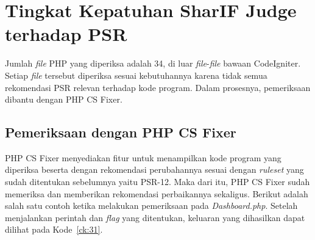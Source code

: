 \section{Tingkat Kepatuhan SharIF Judge terhadap PSR}
\label{sec:tingkat_patuh}
Jumlah \textit{file} PHP yang diperiksa adalah 34, di luar \textit{file}-\textit{file} bawaan CodeIgniter. Setiap \textit{file} tersebut diperiksa sesuai kebutuhannya karena tidak semua rekomendasi PSR relevan terhadap kode program. Dalam prosesnya, pemeriksaan dibantu dengan PHP CS Fixer. 

\subsection{Pemeriksaan dengan PHP CS Fixer}
\label{subsec:periksa_otomatis}
PHP CS Fixer menyediakan fitur untuk menampilkan kode program yang diperiksa beserta dengan rekomendasi perubahannya sesuai dengan \textit{ruleset} yang sudah ditentukan sebelumnya yaitu PSR-12. Maka dari itu, PHP CS Fixer sudah memeriksa dan memberikan rekomendasi perbaikannya sekaligus. Berikut adalah salah satu contoh ketika melakukan pemeriksaan pada \textit{Dashboard.php}.  Setelah menjalankan perintah dan \textit{flag} yang ditentukan, keluaran yang dihasilkan dapat dilihat pada Kode~\ref{ck:31}. 


